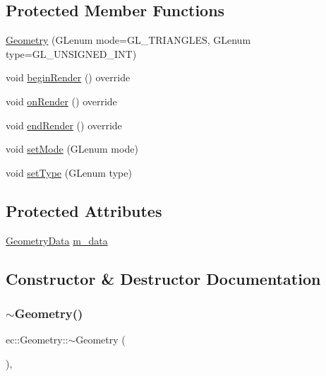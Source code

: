 \subsection*{Protected Member Functions}
\begin{DoxyCompactItemize}
\item 
\mbox{\hyperlink{classec_1_1_geometry_aeae22c6b54c7c534249ee08b3fb77a70}{Geometry}} (G\+Lenum mode=G\+L\+\_\+\+T\+R\+I\+A\+N\+G\+L\+ES, G\+Lenum type=G\+L\+\_\+\+U\+N\+S\+I\+G\+N\+E\+D\+\_\+\+I\+NT)
\item 
void \mbox{\hyperlink{classec_1_1_geometry_aeca5f0e52e7c2e4b352ede1a6e7c3f5b}{begin\+Render}} () override
\item 
void \mbox{\hyperlink{classec_1_1_geometry_a1f166e70fc880e88092f29ef46afb836}{on\+Render}} () override
\item 
void \mbox{\hyperlink{classec_1_1_geometry_ae0352702162501df185517e84c3b02bd}{end\+Render}} () override
\item 
void \mbox{\hyperlink{classec_1_1_geometry_ad4f80cd4d4c22b108c33b9030e91467b}{set\+Mode}} (G\+Lenum mode)
\item 
void \mbox{\hyperlink{classec_1_1_geometry_a12c3da280ff11e86a8b07d18a23e0880}{set\+Type}} (G\+Lenum type)
\end{DoxyCompactItemize}
\subsection*{Protected Attributes}
\begin{DoxyCompactItemize}
\item 
\mbox{\hyperlink{classec_1_1_geometry_data}{Geometry\+Data}} \mbox{\hyperlink{classec_1_1_geometry_aeb72a472b242d92496f0283cfee17fac}{m\+\_\+data}}
\end{DoxyCompactItemize}


\subsection{Constructor \& Destructor Documentation}
\mbox{\label{classec_1_1_geometry_a964c581313da2be51a3c78d3be7f48b3}} 
\subsubsection{\texorpdfstring{$\sim$\+Geometry()}{~Geometry()}}
{\footnotesize\ttfamily ec\+::\+Geometry\+::$\sim$\+Geometry (\begin{DoxyParamCaption}{ }\end{DoxyParamCaption})\hspace{0.3cm}{\ttfamily [virtual]}, {\ttfamily [default]}}

